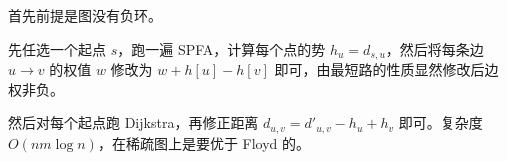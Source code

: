 首先前提是图没有负环。

先任选一个起点 $s$，跑一遍 SPFA，计算每个点的势 $h_u = d_{s, u}$，然后将每条边 $u\to v$ 的权值 $w$ 修改为 $w + h[u] - h[v]$ 即可，由最短路的性质显然修改后边权非负。

然后对每个起点跑 Dijkstra，再修正距离 $d_{u, v} = d'_{u, v} - h_u + h_v$ 即可。复杂度$O(nm\log n)$，在稀疏图上是要优于 Floyd 的。
